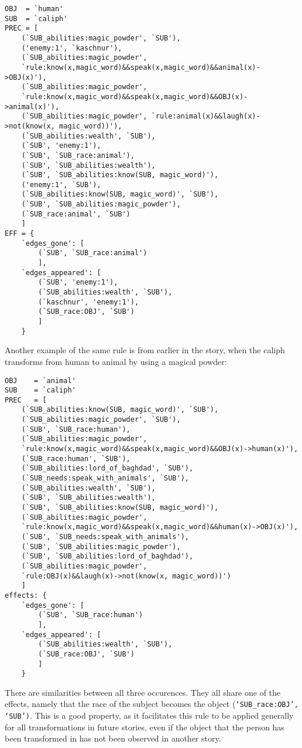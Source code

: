 \begin{verbatim}
OBJ  = `human'
SUB  = `caliph'
PREC = [
    (`SUB_abilities:magic_powder', `SUB'),
    ('enemy:1', `kaschnur'),
    (`SUB_abilities:magic_powder',
    `rule:know(x,magic_word)&&speak(x,magic_word)&&animal(x)->OBJ(x)'),
    (`SUB_abilities:magic_powder',
    `rule:know(x,magic_word)&&speak(x,magic_word)&&OBJ(x)->animal(x)'),
    (`SUB_abilities:magic_powder', `rule:animal(x)&&laugh(x)->not(know(x, magic_word))'),
    (`SUB_abilities:wealth', `SUB'), 
    (`SUB', 'enemy:1'), 
    (`SUB', `SUB_race:animal'),
    (`SUB', `SUB_abilities:wealth'),
    (`SUB', `SUB_abilities:know(SUB, magic_word)'),
    ('enemy:1', `SUB'), 
    (`SUB_abilities:know(SUB, magic_word)', `SUB'),
    (`SUB', `SUB_abilities:magic_powder'), 
    (`SUB_race:animal', `SUB')
    ]
EFF = {
    `edges_gone': [
        (`SUB', `SUB_race:animal')
        ],
    `edges_appeared': [
        (`SUB', 'enemy:1'),
        (`SUB_abilities:wealth', `SUB'),
        (`kaschnur', 'enemy:1'),
        (`SUB_race:OBJ', `SUB')
        ]
    }
\end{verbatim}

Another example of the same rule is from earlier in the story, when the caliph
transforms from human to animal by using a magical powder:

\begin{verbatim}
OBJ    = `animal'
SUB    = `caliph'
PREC   = [
    (`SUB_abilities:know(SUB, magic_word)', `SUB'),
    (`SUB_abilities:magic_powder', `SUB'),
    (`SUB', `SUB_race:human'),
    (`SUB_abilities:magic_powder', 
    `rule:know(x,magic_word)&&speak(x,magic_word)&&OBJ(x)->human(x)'), 
    (`SUB_race:human', `SUB'),
    (`SUB_abilities:lord_of_baghdad', `SUB'),
    (`SUB_needs:speak_with_animals', `SUB'),
    (`SUB_abilities:wealth', `SUB'),
    (`SUB', `SUB_abilities:wealth'),
    (`SUB', `SUB_abilities:know(SUB, magic_word)'),
    (`SUB_abilities:magic_powder',
    `rule:know(x,magic_word)&&speak(x,magic_word)&&human(x)->OBJ(x)'),
    (`SUB', `SUB_needs:speak_with_animals'),
    (`SUB', `SUB_abilities:magic_powder'),
    (`SUB', `SUB_abilities:lord_of_baghdad'),
    (`SUB_abilities:magic_powder', 
    `rule:OBJ(x)&&laugh(x)->not(know(x, magic_word))')
    ]
effects: {
    `edges_gone': [
        (`SUB', `SUB_race:human')
        ],
    `edges_appeared': [
        (`SUB_abilities:wealth', `SUB'),
        (`SUB_race:OBJ', `SUB')
        ]
    }
\end{verbatim}

There are similarities between all three occurences. They all share one of the
effects, namely that the race of the subject becomes the object
(\texttt{`SUB\_race:OBJ', `SUB')}.
This is a good property, as it facilitates this rule to be applied generally for all
transformations in future stories, even if the object that the person has been
transformed in has not been observed in another story.

